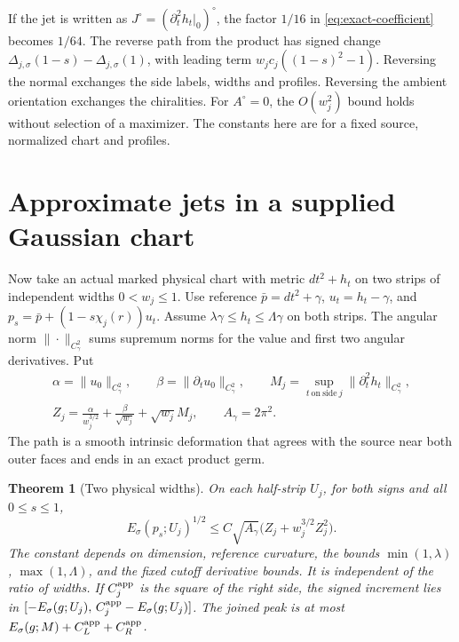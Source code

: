 \documentclass[11pt,letterpaper]{article}
\numberwithin{equation}{section}
\newtheorem{theorem}{Theorem}[section]
\newcommand{\rd}{\gamma}
\begin{document}
If the jet is written as \(J^\circ=(\partial_t^2h_t|_{0})^\circ\),
the factor \(1/16\) in \eqref{eq:exact-coefficient} becomes \(1/64\).
The reverse path from the product has signed change
\(\Delta_{j,\sigma}(1-s)-\Delta_{j,\sigma}(1)\), with leading
term \(w_jc_j((1-s)^2-1)\). Reversing the normal exchanges the
side labels, widths and profiles. Reversing the ambient orientation
exchanges the chiralities. For \(A^\circ=0\), the \(O(w_j^2)\)
bound holds without selection of a maximizer. The constants here
are for a fixed source, normalized chart and profiles.

\section{Approximate jets in a supplied Gaussian chart}

Now take an actual marked physical chart with metric
\(dt^2+h_t\) on two strips of independent widths \(0<w_j\le1\).
Use reference \(\bar p=dt^2+\rd\), \(u_t=h_t-\rd\), and
\(p_s=\bar p+(1-s\chi_j(r))u_t\). Assume
\(\lambda\rd\le h_t\le\Lambda\rd\) on both strips. The angular
norm \(\|\cdot\|_{C^2_\rd}\) sums supremum norms for the value
and first two angular derivatives. Put
\[
 \begin{gathered}
 \alpha=\|u_0\|_{C^2_\rd},\qquad
 \beta=\|\partial_tu_0\|_{C^2_\rd},\qquad
 M_j=\sup_{t\ \mathrm{on\ side}\ j}\|\partial_t^2h_t\|_{C^2_\rd},\\
 Z_j=\frac{\alpha}{w_j^{3/2}}+\frac{\beta}{\sqrt{w_j}}+\sqrt{w_j}M_j,
 \qquad A_\rd=2\pi^2 .
 \end{gathered}
\]
The path is a smooth intrinsic deformation that agrees with the
source near both outer faces and ends in an exact product germ.

\begin{theorem}[Two physical widths]\label{thm:approx}
On each half-strip \(U_j\), for both signs and all \(0\le s\le1\),
\begin{equation}
 E_\sigma(p_s;U_j)^{1/2}
 \le C\sqrt{A_\rd}\bigl(Z_j+w_j^{3/2}Z_j^2\bigr).
 \label{eq:approx}
\end{equation}
The constant depends on dimension, reference curvature, the bounds
\(\min(1,\lambda)\), \(\max(1,\Lambda)\), and the fixed cutoff
derivative bounds. It is independent of the ratio of widths.
If \(C_j^{\rm app}\) is the square of the right side, the signed
increment lies in
\([-E_\sigma(g;U_j),\,C_j^{\rm app}-E_\sigma(g;U_j)]\).
The joined peak is at most \(E_\sigma(g;M)+C_L^{\rm app}+C_R^{\rm app}\).
\end{theorem}
\end{document}
